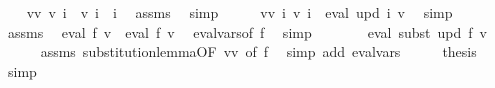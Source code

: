 \begin{isabellebody}
\ \ \isamarkupfalse%
\ v{\isacharprime}{\kern0pt}{\isacharunderscore}{\kern0pt}v{\isacharprime}{\kern0pt}{\isacharprime}{\kern0pt}{\isacharcolon}{\kern0pt}\ {\isachardoublequoteopen}{\isacharquery}{\kern0pt}v{\isacharprime}{\kern0pt}\ i\ {\isacharequal}{\kern0pt}\ {\isacharquery}{\kern0pt}v{\isacharprime}{\kern0pt}{\isacharprime}{\kern0pt}\ i{\isachardoublequoteclose}\ \ i\ \isamarkupfalse%
\ assms\ \isamarkupfalse%
\ simp\isanewline
\ \ \isamarkupfalse%
\ \isamarkupfalse%
\ v{\isacharunderscore}{\kern0pt}v{\isacharprime}{\kern0pt}{\isacharprime}{\kern0pt}{\isacharcolon}{\kern0pt}\ {\isachardoublequoteopen}{\isasymforall}i{\isachardot}{\kern0pt}\ {\isacharquery}{\kern0pt}v{\isacharprime}{\kern0pt}{\isacharprime}{\kern0pt}\ i\ {\isacharequal}{\kern0pt}\ eval\ {\isacharparenleft}{\kern0pt}upd\ i{\isacharparenright}{\kern0pt}\ v{\isachardoublequoteclose}\ \isamarkupfalse%
\ simp\isanewline
\isanewline
\ \ \isamarkupfalse%
\ assms\ \isamarkupfalse%
\ {\isachardoublequoteopen}eval\ f\ v\ {\isacharequal}{\kern0pt}\ eval\ f\ {\isacharquery}{\kern0pt}v{\isacharprime}{\kern0pt}{\isachardoublequoteclose}\ \isamarkupfalse%
\ eval{\isacharunderscore}{\kern0pt}vars{\isacharbrackleft}{\kern0pt}of\ f{\isacharbrackright}{\kern0pt}\ \isamarkupfalse%
\ simp\isanewline
\ \ \isamarkupfalse%
\ \isamarkupfalse%
\ {\isachardoublequoteopen}{\isasymdots}\ {\isacharequal}{\kern0pt}\ eval\ {\isacharparenleft}{\kern0pt}subst\ upd\ f{\isacharparenright}{\kern0pt}\ v{\isachardoublequoteclose}\isanewline
\ \ \ \ \isamarkupfalse%
\ assms\ substitution{\isacharunderscore}{\kern0pt}lemma{\isacharbrackleft}{\kern0pt}OF\ v{\isacharunderscore}{\kern0pt}v{\isacharprime}{\kern0pt}{\isacharprime}{\kern0pt}{\isacharcomma}{\kern0pt}\ of\ f{\isacharbrackright}{\kern0pt}\ \isamarkupfalse%
\ {\isacharparenleft}{\kern0pt}simp\ add{\isacharcolon}{\kern0pt}\ eval{\isacharunderscore}{\kern0pt}vars{\isacharparenright}{\kern0pt}\isanewline
\ \ \isamarkupfalse%
\ \isamarkupfalse%
\ {\isacharquery}{\kern0pt}thesis\ \isamarkupfalse%
\ simp\isanewline
{}\isamarkupfalse%
%
\endisatagproof
{\isafoldproof}%
%
\isadelimproof
%
\endisadelimproof
%
\isadelimdocument
%
\endisadelimdocument
%
\isatagdocument
%
\end{isabellebody}
